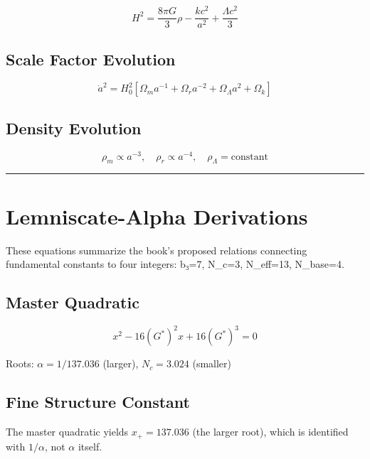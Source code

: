 \documentclass[
  11pt,
  letterpaper,
  twoside,
  openright]{book}
\begin{document}
\[
H^2 = \frac{8\pi G}{3}\rho - \frac{k c^2}{a^2} + \frac{\Lambda c^2}{3}
\]

\subsection{Scale Factor Evolution}\label{scale-factor-evolution}

\[
\dot{a}^2 = H_0^2\left[\Omega_m a^{-1} + \Omega_r a^{-2} + \Omega_\Lambda a^2 + \Omega_k\right]
\]

\subsection{Density Evolution}\label{density-evolution}

\[
\rho_m \propto a^{-3}, \quad \rho_r \propto a^{-4}, \quad \rho_\Lambda = \text{constant}
\]

\begin{center}\rule{0.5\linewidth}{0.5pt}\end{center}

\section{Lemniscate-Alpha
Derivations}\label{lemniscate-alpha-derivations}

These equations summarize the book's proposed relations connecting
fundamental constants to four integers: b₃=7, N\_c=3, N\_eff=13,
N\_base=4.

\subsection{Master Quadratic}\label{master-quadratic}

\[
x^2 - 16(G^*)^2 x + 16(G^*)^3 = 0
\]

Roots: \(\alpha = 1/137.036\) (larger), \(N_c = 3.024\) (smaller)

\subsection{Fine Structure Constant}\label{fine-structure-constant}

\begin{tcolorbox}[enhanced jigsaw, coltitle=black, colbacktitle=quarto-callout-warning-color!10!white, toprule=.15mm, colframe=quarto-callout-warning-color-frame, arc=.35mm, opacityback=0, bottomtitle=1mm, toptitle=1mm, breakable, colback=white, titlerule=0mm, opacitybacktitle=0.6, title=\textcolor{quarto-callout-warning-color}{\faExclamationTriangle}\hspace{0.5em}{Notation Clarification}, rightrule=.15mm, bottomrule=.15mm, leftrule=.75mm, left=2mm]

The master quadratic yields \(x_+ = 137.036\) (the larger root), which
is identified with \(1/\alpha\), not \(\alpha\) itself.

\end{tcolorbox}
\end{document}
